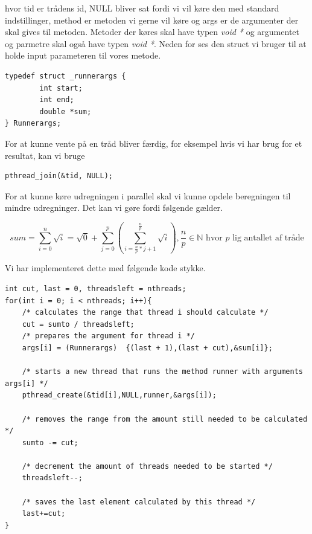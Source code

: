\documentclass[danish]{report}
\begin{document}
hvor tid er trådens id, NULL bliver sat fordi vi vil køre den med standard indstillinger, method er metoden vi gerne vil køre og args er de argumenter der skal gives til metoden. Metoder der køres skal have typen \textit{void *} og argumentet og parmetre skal også have typen \textit{void *}. Neden for ses den struct vi bruger til at holde input parameteren til vores metode.

\begin{lstlisting}
typedef struct _runnerargs {
        int start;
        int end;
        double *sum;
} Runnerargs;
\end{lstlisting}

For at kunne vente på en tråd bliver færdig, for eksempel hvis vi har brug for et resultat, kan vi bruge 

\begin{lstlisting}
pthread_join(&tid, NULL);
\end{lstlisting}


For at kunne køre udregningen i parallel skal vi kunne opdele beregningen til mindre udregninger. Det kan vi gøre fordi følgende gælder.

\begin{equation*}
sum = \displaystyle\sum\limits_{i=0}^n \sqrt{i} = \sqrt{0} + \displaystyle\sum\limits_{j=0}^{p} \left( \displaystyle\sum\limits_{i=\frac{n}{p}*j+1}^{\frac{n}{p}} \sqrt{i} \right), \frac{n}{p} \in \mathbb{N} \text{ hvor } p \text{ lig antallet af tråde}
\end{equation*}


Vi har implementeret dette med følgende kode stykke.

\begin{lstlisting}
int cut, last = 0, threadsleft = nthreads;
for(int i = 0; i < nthreads; i++){
    /* calculates the range that thread i should calculate */
    cut = sumto / threadsleft;
    /* prepares the argument for thread i */
    args[i] = (Runnerargs)  {(last + 1),(last + cut),&sum[i]};

    /* starts a new thread that runs the method runner with arguments args[i] */
    pthread_create(&tid[i],NULL,runner,&args[i]);

    /* removes the range from the amount still needed to be calculated */
    sumto -= cut;

    /* decrement the amount of threads needed to be started */
    threadsleft--;

    /* saves the last element calculated by this thread */
    last+=cut;
}
\end{lstlisting}
\end{document}

